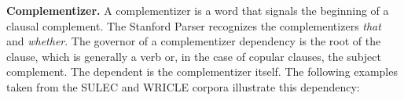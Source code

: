 \documentclass[main.tex]{subfiles}
\begin{document}
\textbf{Complementizer.} A complementizer is a word that signals the beginning of a clausal complement. The Stanford Parser recognizes the complementizers \textit{that} and \textit{whether}. The governor of a complementizer dependency is the root of the clause, which is generally a verb or, in the case of copular clauses, the subject complement. The dependent is the complementizer itself. The following examples taken from the SULEC and WRICLE corpora illustrate this dependency:

\end{document}
